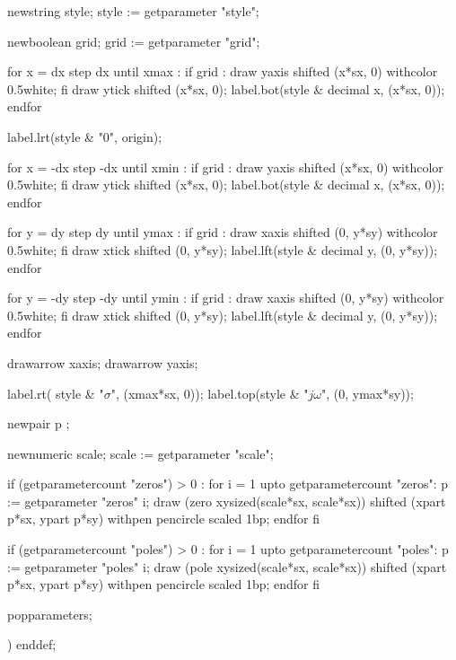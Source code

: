    newstring style;
    style := getparameter "style";

    newboolean grid;
    grid  := getparameter "grid";

    for x = dx step dx until xmax :
        if grid :
            draw yaxis shifted (x*sx, 0) withcolor 0.5white;
        fi
        draw ytick shifted (x*sx, 0);
        label.bot(style & decimal x, (x*sx, 0));
    endfor

    label.lrt(style & "0", origin);

    for x = -dx step -dx until xmin :
        if grid :
            draw yaxis shifted (x*sx, 0) withcolor 0.5white;
        fi
        draw ytick shifted (x*sx, 0);
        label.bot(style & decimal x, (x*sx, 0));
    endfor

    for y = dy step dy until ymax :
        if grid :
            draw xaxis shifted (0, y*sy) withcolor 0.5white;
        fi
        draw xtick shifted (0, y*sy);
        label.lft(style & decimal y, (0, y*sy));
    endfor

    for y = -dy step -dy until ymin :
        if grid :
            draw xaxis shifted (0, y*sy) withcolor 0.5white;
        fi
        draw xtick shifted (0, y*sy);
        label.lft(style & decimal y, (0, y*sy));
    endfor


    drawarrow xaxis;
    drawarrow yaxis;

    label.rt( style & "$\sigma$",  (xmax*sx, 0));
    label.top(style & "$jω$", (0, ymax*sy));

    newpair p ;

    newnumeric scale;
    scale := getparameter "scale";

    if (getparametercount "zeros") > 0 :
          for i = 1 upto getparametercount "zeros":
            p := getparameter "zeros" i;
            draw (zero xysized(scale*sx, scale*sx))
                 shifted (xpart p*sx, ypart p*sy)
                 withpen pencircle scaled 1bp;
            endfor
    fi

    if (getparametercount "poles") > 0 :
          for i = 1 upto getparametercount "poles":
            p := getparameter "poles" i;
            draw (pole xysized(scale*sx, scale*sx))
                 shifted (xpart p*sx, ypart p*sy)
                 withpen pencircle scaled 1bp;
            endfor
    fi


    popparameters;

  )
enddef;
\stopMPdefinitions

\stopenvironment
